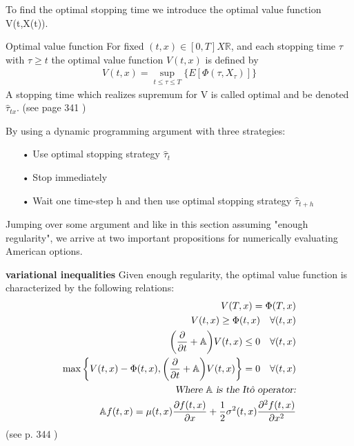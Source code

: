 To find the optimal stopping time we introduce the optimal value function V(t,X(t)).
\theoremstyle{definition}
\begin{definition}{Optimal value function }\label{optValFunc}
For fixed $(t,x)\in [0,T]X\mathbb{R}$, and each stopping time $\tau$ with $\tau\geq t$ the optimal value function $V(t,x)$ is defined by
\begin{align}
V(t,x)=\sup_{t \leq \tau\leq T}\{E[\Phi(\tau,X_{\tau})]\}
\end{align}
A stopping time which realizes supremum for V is called optimal and be denoted $\hat{\tau}_{tx}$.
(see page 341 \parencite{finKont})
\end{definition}
By using a dynamic programming argument with three strategies:
\begin{enumerate}
\item[•] Use optimal stopping strategy $\hat{\tau}_t$
\item[•] Stop immediately
\item[•] Wait one time-step h and then use optimal stopping strategy $\hat{\tau}_{t+h}$
\end{enumerate}
Jumping over some argument and like in this section assuming "enough regularity", we arrive at two important propositions for numerically evaluating American options.

\begin{proposition}{\textbf{variational inequalities}}\label{varInEq}
Given enough regularity, the optimal value function is characterized by the following relations:
\begin{equation}
\begin{split}
V(T,x)=\Phi(T,x)\\
V(t,x)\geq \Phi(t,x) \quad \forall (t,x)\\
\bigg(\frac{\partial}{\partial t} + \mathbb{A}\bigg)V(t,x) \leq 0 \quad \forall (t,x)\\
\max\bigg\{V(t,x) - \Phi(t,x), \bigg(\frac{\partial}{\partial t} + \mathbb{A}\bigg)V(t,x) \bigg\} = 0 \quad \forall (t,x)\\
\textsl{Where $\mathbb{A}$ is the Itô operator:}\\
\mathbb{A}f(t,x) =  \mu(t,x) \frac{\partial f(t,x)}{\partial x} + \frac{1}{2} \sigma^2(t,x) \frac{\partial^2 f(t,x)}{\partial x^2}
\end{split}
\end{equation}
(see p. 344 \parencite{finKont})
\end{proposition}

